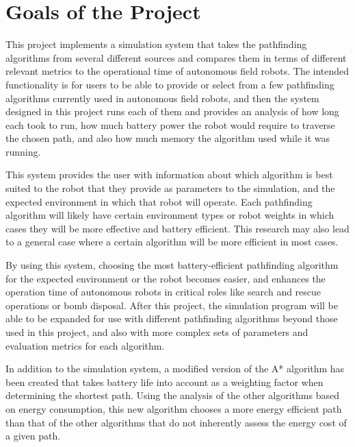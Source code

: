 \section{Goals of the Project}
\label{sec:goals}
This project implements a simulation system that takes the pathfinding algorithms from several different sources and compares them in terms of different relevant metrics to the operational time of autonomous field robots. The intended functionality is for users to be able to provide or select from a few pathfinding algorithms currently used in autonomous field robots, and then the system designed in this project runs each of them and provides an analysis of how long each took to run, how much battery power the robot would require to traverse the chosen path, and also how much memory the algorithm used while it was running.
\par
This system provides the user with information about which algorithm is best suited to the robot that they provide as parameters to the simulation, and the expected environment in which that robot will operate. Each pathfinding algorithm will likely have certain environment types or robot weights in which cases they will be more effective and battery efficient. This research may also lead to a general case where a certain algorithm will be more efficient in most cases.
\par
By using this system, choosing the most battery-efficient pathfinding algorithm for the expected environment or the robot becomes easier, and enhances the operation time of autonomous robots in critical roles like search and rescue operations or bomb disposal. After this project, the simulation program will be able to be expanded for use with different pathfinding algorithms beyond those used in this project, and also with more complex sets of parameters and evaluation metrics for each algorithm.
\par
In addition to the simulation system, a modified version of the A* algorithm has been created that takes battery life into account as a weighting factor when determining the shortest path. Using the analysis of the other algorithms based on energy consumption, this new algorithm chooses a more energy efficient path than that of the other algorithms that do not inherently assess the energy cost of a given path. 

